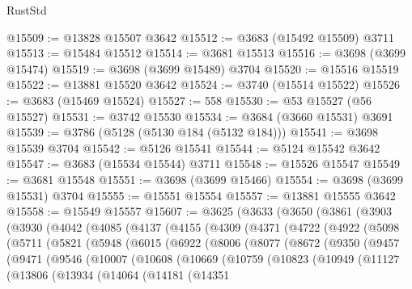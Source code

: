 \begin{lexlean}{RustStd}
\begin{coremodule}
{\begin{coremodule}
{{{{{{{{{{{{{{{{{{{{{{{{{{{{{{{{{{{{{{{{{{{{{{{@15509 := @13828 @15507 @3642
@15512 := @3683 (@15492 @15509) @3711
@15513 := @15484 @15512
@15514 := @3681 @15513
@15516 := @3698 (@3699 @15474)
@15519 := @3698 (@3699 @15489) @3704
@15520 := @15516 @15519
@15522 := @13881 @15520 @3642
@15524 := @3740 (@15514 @15522)
@15526 := @3683 (@15469 @15524)
@15527 := 558
@15530 := @53 @15527 (@56 @15527)
@15531 := @3742 @15530
@15534 := @3684 (@3660 @15531) @3691
@15539 := @3786 (@5128 (@5130 @184 (@5132 @184)))
@15541 := @3698 @15539 @3704
@15542 := @5126 @15541
@15544 := @5124 @15542 @3642
@15547 := @3683 (@15534 @15544) @3711
@15548 := @15526 @15547
@15549 := @3681 @15548
@15551 := @3698 (@3699 @15466)
@15554 := @3698 (@3699 @15531) @3704
@15555 := @15551 @15554
@15557 := @13881 @15555 @3642
@15558 := @15549 @15557
@15607 := @3625
    (@3633
      (@3650
        (@3861
          (@3903
            (@3930
              (@4042
                (@4085
                  (@4137
                    (@4155
                      (@4309
                        (@4371
                          (@4722
                            (@4922
                              (@5098
                                (@5711
                                  (@5821
                                    (@5948
                                      (@6015
                                        (@6922
                                          (@8006
                                            (@8077
                                              (@8672
                                                (@9350
                                                  (@9457
                                                    (@9471
                                                      (@9546
                                                        (@10007
                                                          (@10608
                                                            (@10669
                                                              (@10759
                                                                (@10823
                                                                  (@10949
                                                                    (@11127
                                                                      (@13806
                                                                        (@13934
                                                                          (@14064
                                                                            (@14181
                                                                              (@14351
}}}}}}}}}}}}}}}}}}}}}}}}}}}}}}}}}}}}}}}}}}}}}}}
\end{coremodule}}
\end{coremodule}
\end{lexlean}
